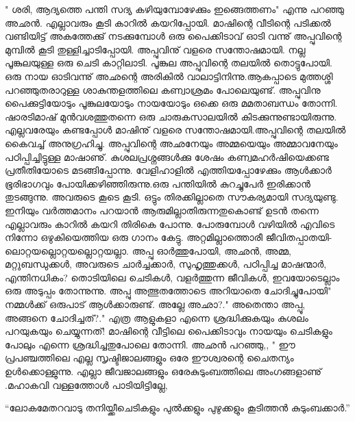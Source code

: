 " ശരി, ആദ്യത്തെ പന്തി സദ്യ കഴിയുമ്പോഴേക്കും ഇങ്ങെത്തണം" എന്നു പറഞ്ഞു അഛൻ. എല്ലാവരും കൂടി കാറിൽ കയറിപ്പോയി.
    മാഷിന്റെ വീടിന്റെ പടിക്കൽ വണ്ടിയിട്ട് അകത്തേക്കു് നടക്കുമ്പോൾ ഒരു പൈക്കിടാവ് ഓടി വന്നു് അപ്പുവിന്റെ മുമ്പിൽ  കൂടി തുള്ളിച്ചാടിപ്പോയി. അപ്പുവിനു് വളരെ സന്തോഷമായി. നല്ല പൂങ്കുലയുള്ള ഒരു ചെടി കാറ്റിലാടി. പൂങ്കുല അപ്പുവിന്റെ തലയിൽ തൊട്ടുപോയി. ഒരു നായ ഓടിവന്നു് അഛന്റെ അരികിൽ വാലാട്ടിനിന്നു.ആകപ്പാടെ മുത്തശ്ശി പറഞ്ഞുതരാറുള്ള ശാകുന്തളത്തിലെ കണ്വാശ്രമം പോലെയുണ്ട്. അപ്പുവിനു പൈക്കുട്ടിയോടും പൂങ്കുലയോടും നായയോടും ഒക്കെ ഒരു മമതാബന്ധം തോന്നി.
   ഷാരടിമാഷ് മുൻ‌വശത്തുതന്നെ ഒരു ചാരുകസാലയിൽ കിടക്കുന്നുണ്ടായിരുന്നു. എല്ലവരേയും കണ്ടപ്പോൾ മാഷിനു് വളരെ സന്തോഷമായി.അപ്പുവിന്റെ തലയിൽ കൈവച്ച് അനുഗ്രഹിച്ചു. അപ്പുവിന്റെ അഛനേയും അമ്മയെയും അമ്മാവനേയും പഠിപ്പിച്ചിട്ടുള്ള മാഷാണു്. കുശലപ്രശ്നങ്ങൾക്കു ശേഷം കണ്വമഹർഷിയെക്കണ്ട പ്രതീതിയോടെ മടങ്ങിപ്പോന്നു.
       വേളിഹാളിൽ എത്തിയപ്പോഴേക്കും ആൾക്കാർ ഭൂരിഭാഗവും പോയിക്കഴിഞ്ഞിരുന്നു.ഒരു പന്തിയിൽ കുറച്ചുപേർ ഇരിക്കാൻ തുടങ്ങുന്നു. അവരുടെ കൂടെ കൂടി. ഒട്ടും തിരക്കില്ലാതെ സൗകര്യമായി സദ്യയുണ്ടു. ഇനിയും വർത്തമാനം പറയാൻ ആരുമില്ലാതിരുന്നതുകൊണ്ട് ഉടൻ തന്നെ എല്ലാവരും കാറിൽ കയറി തിരികെ പോന്നു. പോരുമ്പോൾ വഴിയിൽ എവിടെ നിന്നോ ഒഴുകിയെത്തിയ ഒരു ഗാനം കേട്ടു.
\hspace{2em}അറ്റമില്ലാത്തൊരീ ജീവിതപ്പാതയി-
\hspace{2em}ലൊറ്റയല്ലൊറ്റയല്ലൊറ്റയല്ലാ.
അപ്പു ഓർത്തുപോയി, അഛൻ, അമ്മ, മറ്റുബന്ധുക്കൾ, അവരുടെ ചാർച്ചക്കാർ, സുഹൃത്തുക്കൾ, പഠിപ്പിച്ച മാഷന്മാർ, എന്തിനധികം? തൊടിയിലെ ചെടികൾ, വളർത്തുന്ന ജീവികൾ, ഇവയോടെല്ലാം ഒരു അടുപ്പം തോന്നുന്നു.
അപ്പു അത്ഭുതത്തോടെ അറിയാതെ ചോദിച്ചുപോയി" നമ്മൾക്ക് ഒരുപാട് ആൾക്കാരുണ്ട്. അല്ലേ അഛാ?." 
അതെന്താ അപ്പൂ, അങ്ങനെ ചോദിച്ചത്?." 
എത്ര ആളുകളാ എന്നെ ശ്രദ്ധിക്കുകയും കുശലം പറയുകയും ചെയ്യുന്നത്! മാഷിന്റെ വീട്ടിലെ പൈക്കിടാവും നായയും ചെടികളും പോലും എന്നെ ശ്രദ്ധിച്ചതുപോലെ തോന്നി.
അഛൻ പറഞ്ഞു,, " ഈ പ്രപഞ്ചത്തിലെ എല്ല സൃഷ്ടിജാലങ്ങളും ഒരേ ഈശ്വരന്റെ ചൈതന്യം ഉൾക്കൊള്ളുന്നു. എല്ലാ ജീവജാലങ്ങളും ഒരേകുടുംബത്തിലെ അംഗങ്ങളാണു് .മഹാകവി വള്ളത്തോൾ പാടിയിട്ടില്ലേ,
\begin{center}
``ലോകമേതറവാടു തനിയ്ക്കീചെടികളും പുൽക്കളും പുഴുക്കളും കൂടിത്തൻ കുടുംബക്കാർ.''
\end{center}
